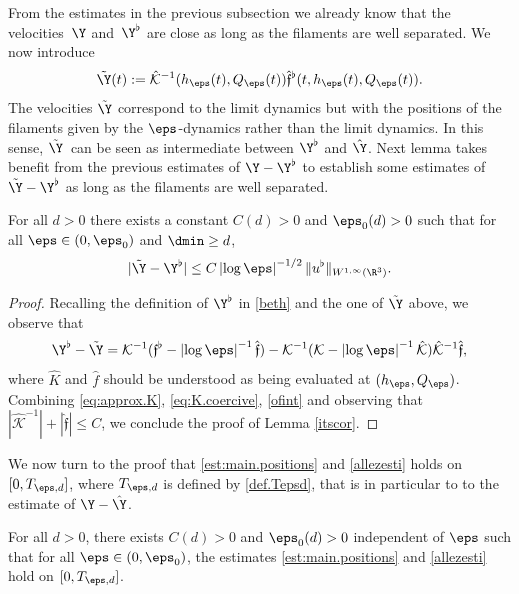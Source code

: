 From the estimates in the previous subsection
we already know that the velocities~$\Y$ and~$\Y^\flat$ are close as long as the filaments are well separated.
We now introduce
\begin{equation}\label{def.tildeY}
\tilde { \Y}(t) := \hat {\mathcal K}^{-1}(h_\eps(t),Q_\eps(t)) \hat {\mathfrak{f}}^\flat(t, h_\eps(t),Q_\eps(t)).
\end{equation}
The velocities $\tilde \Y$ correspond to the limit dynamics but with the positions of the filaments given by the $\eps$-dynamics rather than the limit dynamics. In this sense, $\tilde \Y$~can be seen as intermediate between $\Y^\flat$ and $\hat \Y$.
Next lemma takes benefit from the previous estimates of $\Y - \Y^\flat$ to establish
some estimates of $\tilde \Y - {\Y^\flat}$ as long as the filaments are well separated.
\begin{Lemma}
\label{itscor}
For all $d > 0$ there exists a constant $C(d) > 0$ and $\eps_0(d) > 0$ such that for all $\eps \in(0,\eps_0)$ and $\dmin \geq d$,
\begin{equation}
|\tilde {\Y} - {\Y^\flat}| \leq C \left|\log \eps\right|^{-1/2} \|u^\flat\|_{W^{1,\infty}(\R^3)}. \label{eq:Faxen.velocites}
\end{equation}
\end{Lemma}
\begin{proof}
Recalling the definition of ${\Y^\flat}$ in
\eqref{beth} and the one of $\tilde \Y$ above, we observe that
\begin{equation*}
{\Y^\flat} - \tilde \Y =
\mathcal K^{-1} (\mathfrak{f}^\flat -\left|\log \eps\right|^{-1} \hat {\mathfrak{f}}) -
\mathcal K^{-1} (\mathcal K - \left|\log \eps\right|^{-1} \mathcal {\hat K}) \mathcal {\hat K}^{-1} \hat {\mathfrak{f}},
\end{equation*}
where $\hat K$ and $\hat f$ should be understood as being evaluated at $(h_{\eps},Q_\eps)$.
Combining \eqref{eq:approx.K}, \eqref{eq:K.coercive}, \eqref{ofint} and observing that
$
| \mathcal {\hat K}^{-1} | + |\hat {\mathfrak{f}} |
\leq C $,
we conclude the proof of Lemma \ref{itscor}.
\end{proof}
We now turn to the proof that \eqref{est:main.positions} and
\eqref{allezesti} holds on $[0,T_{\eps,d}]$, where $T_{\eps,d}$ is defined by \eqref{def.Tepsd},
that is in particular to to the
estimate of $ \Y - \hat \Y$.
\begin{Proposition}\label{pbis}
For all $d>0$, there exists $C(d)>0$ and $\eps_0(d)>0$ independent of $\eps$ such that
for all $\eps\in(0,\eps_0)$, the estimates
\eqref{est:main.positions} and
\eqref{allezesti} hold on $[0,T_{\eps,d}]$.
\end{Proposition}

